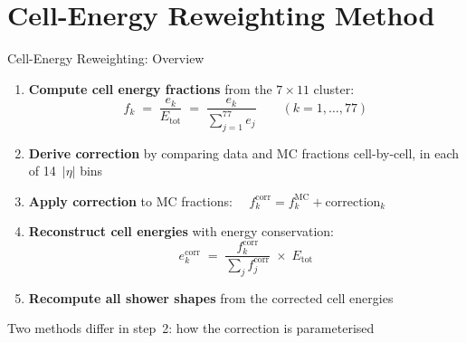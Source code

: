 \documentclass[aspectratio=169,10pt]{beamer}
\begin{document}
\section{Cell-Energy Reweighting Method}

\begin{frame}{Cell-Energy Reweighting: Overview}

\begin{enumerate}
  \item \textbf{Compute cell energy fractions} from the $7\!\times\!11$ cluster:
  \[
    f_k \;=\; \frac{e_k}{E_\text{tot}}
    \;=\; \frac{e_k}{\displaystyle\sum_{j=1}^{77} e_j}
    \qquad (k = 1,\ldots,77)
  \]

  \item \textbf{Derive correction} by comparing data and MC fractions
        cell-by-cell, in each of 14~$|\eta|$ bins

  \item \textbf{Apply correction} to MC fractions:
  $\quad f_k^\text{corr} = f_k^\text{MC} + \text{correction}_k$

  \item \textbf{Reconstruct cell energies} with energy conservation:
  \[
    e_k^\text{corr} \;=\;
    \frac{f_k^\text{corr}}{\displaystyle\sum_j f_j^\text{corr}}
    \;\times\; E_\text{tot}
  \]

  \item \textbf{Recompute all shower shapes} from the corrected cell energies
\end{enumerate}

\vspace{4pt}
\centering
{\small\color{atlasblue} Two methods differ in step~2: how the correction is parameterised}
\end{frame}
\end{document}
